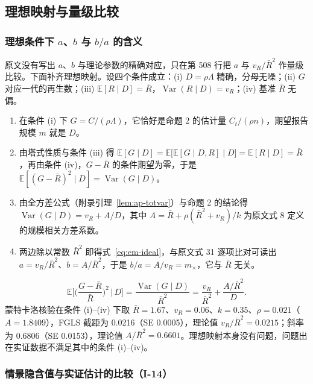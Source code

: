 \subsection{理想映射与量级比较}

\subsubsection{理想条件下 $a$、$b$ 与 $b/a$ 的含义}

原文没有写出 $a$、$b$ 与理论参数的精确对应，只在第 508 行把 $a$ 与 $v_R/\bar R^2$ 作量级比较。下面补齐理想映射。设四个条件成立：(i) $D=\rho\Lambda$ 精确，分母无噪；(ii) $G$ 对应一代的再生数；(iii) $\mathbb{E}[R\mid D]=\bar R$，$\operatorname{Var}(R\mid D)=v_R$；(iv) 基准 $\bar R$ 无偏。
\begin{enumerate}
\item 在条件 (i) 下 $G=C/(\rho\Lambda)$，它恰好是命题 2 的估计量 $C_t/(\rho n)$，期望报告规模 $m$ 就是 $D$。
\item 由塔式性质与条件 (iii) 得 $\mathbb{E}[G\mid D]=\mathbb{E}\big[\mathbb{E}[G\mid D,R]\mid D\big]=\mathbb{E}[R\mid D]=\bar R$，再由条件 (iv)，$G-\bar R$ 的条件期望为零，于是 $\mathbb{E}[(G-\bar R)^2\mid D]=\operatorname{Var}(G\mid D)$。
\item 由全方差公式（附录引理~\ref{lem:ap-totvar}）与命题 2 的结论得 $\operatorname{Var}(G\mid D)=v_R+A/D$，其中 $A=\bar R+\rho(\bar R^2+v_R)/k$ 为原文式 8 定义的规模相关方差系数。
\item 两边除以常数 $\bar R^2$ 即得式~\ref{eq:em-ideal}，与原文式 31 逐项比对可读出 $a=v_R/\bar R^2$、$b=A/\bar R^2$，于是 $b/a=A/v_R=m_\times$，它与 $\bar R$ 无关。
\end{enumerate}
\begin{equation}\label{eq:em-ideal}
\mathbb{E}\Big[\Big(\frac{G-\bar R}{\bar R}\Big)^2\,\Big|\,D\Big]=\frac{\operatorname{Var}(G\mid D)}{\bar R^2}=\frac{v_R}{\bar R^2}+\frac{A/\bar R^2}{D}.
\end{equation}
蒙特卡洛核验在条件 (i)--(iv) 下取 $\bar R=1.67$、$v_R=0.06$、$k=0.35$、$\rho=0.021$（$A=1.8409$），FGLS 截距为 0.0216（SE 0.0005），理论值 $v_R/\bar R^2=0.0215$；斜率为 0.6806（SE 0.0153），理论值 $A/\bar R^2=0.6601$。理想映射本身没有问题，问题出在实证数据不满足其中的条件 (i)--(iv)。

\subsubsection{情景隐含值与实证估计的比较（I-14）}

